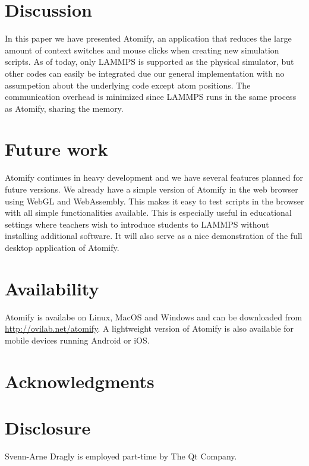 \documentclass[aps,pre,twocolumn,letterpaper,floatfix,nofootinbib]{revtex4}
\begin{document}
\section{\label{sec:discussion}Discussion}
In this paper we have presented Atomify, an application that reduces the large amount of context switches and mouse clicks
when creating new simulation scripts.
As of today, only LAMMPS is supported as the physical simulator, but other codes can easily be integrated
due our general implementation with no assumpetion about the underlying code except atom positions.
The communication overhead is minimized since LAMMPS runs in the same process as Atomify, sharing the memory.

\section{\label{sec:future}Future work}
Atomify continues in heavy development and we have several features planned for future versions.
We already have a simple version of Atomify in the web browser using WebGL and WebAssembly.
This makes it easy to test scripts in the browser with all simple functionalities available.
This is especially useful in educational settings where teachers wish to introduce students
to LAMMPS without installing additional software.
It will also serve as a nice demonstration of the full desktop application of Atomify.

\section{Availability}
Atomify is availabe on Linux, MacOS and Windows and can be downloaded from
\href{https://ovilab.net/atomify}{http://ovilab.net/atomify}.
A lightweight version of Atomify is also available for mobile devices running
Android or iOS.

\section{Acknowledgments}

\section{Disclosure}

Svenn-Arne Dragly is employed part-time by The Qt Company.


\end{document}
